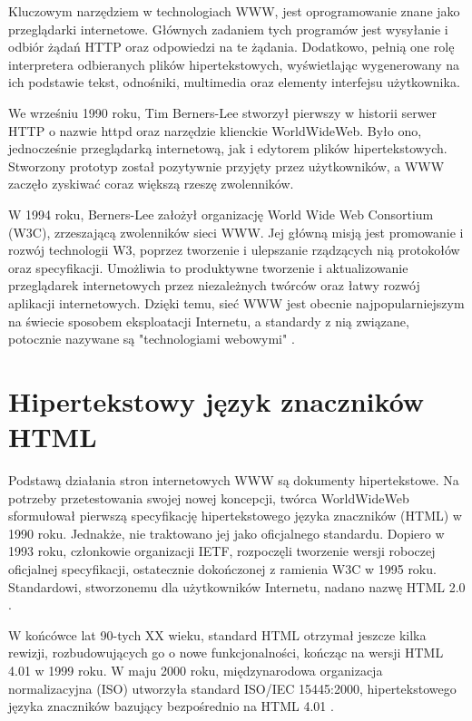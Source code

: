 Kluczowym narzędziem w technologiach WWW, jest oprogramowanie znane jako przeglądarki internetowe. Głównych zadaniem tych programów jest wysyłanie i odbiór żądań HTTP oraz odpowiedzi na te żądania. Dodatkowo, pełnią one rolę interpretera odbieranych plików hipertekstowych, wyświetlając wygenerowany na ich podstawie tekst, odnośniki, multimedia oraz elementy interfejsu użytkownika.

We wrześniu 1990 roku, Tim Berners-Lee stworzył pierwszy w historii serwer HTTP o nazwie httpd oraz narzędzie klienckie WorldWideWeb. Było ono, jednocześnie przeglądarką internetową, jak i edytorem plików hipertekstowych. Stworzony prototyp został pozytywnie przyjęty przez użytkowników, a WWW zaczęło zyskiwać coraz większą rzeszę zwolenników.

W 1994 roku, Berners-Lee założył organizację World Wide Web Consortium (W3C), zrzeszającą zwolenników sieci WWW. Jej główną misją jest promowanie i rozwój technologii W3, poprzez tworzenie i ulepszanie rządzących nią protokołów oraz specyfikacji. Umożliwia to produktywne tworzenie i aktualizowanie przeglądarek internetowych przez niezależnych twórców oraz łatwy rozwój aplikacji internetowych. Dzięki temu, sieć WWW jest obecnie najpopularniejszym na świecie sposobem eksploatacji Internetu, a standardy z nią związane, potocznie nazywane są "technologiami webowymi" \cite{W3C.about}.

\section{Hipertekstowy język znaczników HTML}

Podstawą działania stron internetowych WWW są dokumenty hipertekstowe. Na potrzeby przetestowania swojej nowej koncepcji, twórca WorldWideWeb sformułował pierwszą specyfikację hipertekstowego języka znaczników (HTML) w 1990 roku. Jednakże, nie traktowano jej jako oficjalnego standardu. Dopiero w 1993 roku, członkowie organizacji IETF, rozpoczęli tworzenie wersji roboczej oficjalnej specyfikacji, ostatecznie dokończonej z ramienia W3C w 1995 roku. Standardowi, stworzonemu dla użytkowników Internetu, nadano nazwę HTML 2.0 \cite{RFC.1866.HTML-2}. 

W końcówce lat 90-tych XX wieku, standard HTML otrzymał jeszcze kilka rewizji, rozbudowujących go o nowe funkcjonalności, kończąc na wersji HTML 4.01 w 1999 roku. W maju 2000 roku, międzynarodowa organizacja normalizacyjna (ISO) utworzyła standard ISO/IEC 15445:2000, hipertekstowego języka znaczników bazujący bezpośrednio na HTML 4.01 \cite{ISO.HTML}.

